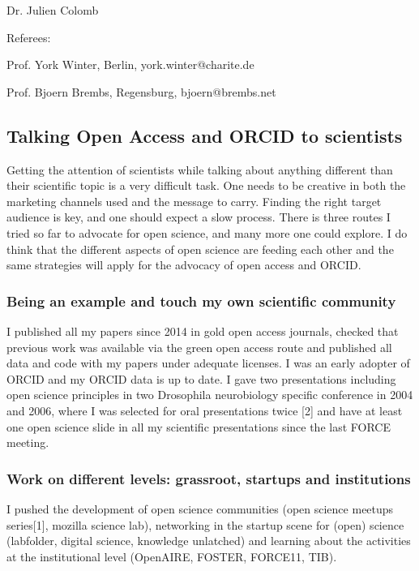 Dr. Julien Colomb



\vspace {1.cm} 

Referees:

Prof. York Winter, Berlin, york.winter@charite.de
 
 
Prof. Bjoern Brembs, Regensburg, bjoern@brembs.net
\newpage

\begin{multicols}{2}

\section{Talking Open Access and ORCID to scientists}

Getting the attention of scientists while talking about anything different than their scientific topic is a very difficult task. One needs to be creative in both the marketing channels used and the message to carry. Finding the right target audience is key, and one should expect a slow process.
%
There is three routes I tried so far to advocate for open science, and many more one could explore. I do think that the different aspects of open science are feeding each other and the same strategies will apply for the advocacy of open access and ORCID. 
\subsubsection*{Being an example and touch my own scientific community}
I published all my papers since 2014 in gold open access journals, checked that previous work was available via the green open access route and published all data and code with my papers under adequate licenses. I was an early adopter of ORCID and my ORCID data is up to date. I gave two presentations including open science principles in two Drosophila neurobiology specific conference in 2004 and 2006, where I was selected for oral presentations twice [2] and have at least one open science slide in all my scientific presentations since the last FORCE meeting.
\subsubsection*{Work on different levels: grassroot, startups and institutions}
I pushed the development of open science communities (open science meetups series[1], mozilla science lab), networking in the startup scene for (open) science (labfolder, digital science, knowledge unlatched) and learning about the activities at the institutional level (OpenAIRE, FOSTER, FORCE11, TIB). 

\end{multicols}
